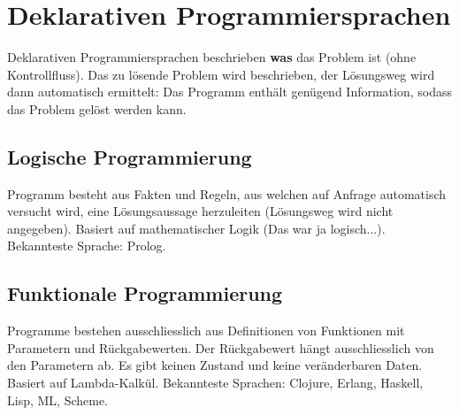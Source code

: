 \section{Deklarativen Programmiersprachen}

Deklarativen Programmiersprachen beschrieben \textbf{was} das Problem ist (ohne Kontrollfluss). Das zu lösende Problem wird beschrieben, der Lösungsweg wird dann automatisch ermittelt: Das Programm enthält genügend Information, sodass das Problem gelöst werden kann.

\subsection{Logische Programmierung}

Programm besteht aus Fakten und Regeln, aus welchen auf Anfrage automatisch versucht wird, eine Lösungsaussage herzuleiten (Lösungsweg wird nicht angegeben). Basiert auf mathematischer Logik (Das war ja logisch...). Bekannteste Sprache: Prolog.

\subsection{Funktionale Programmierung}

Programme bestehen ausschliesslich aus Definitionen von Funktionen mit Parametern und Rückgabewerten. Der Rückgabewert hängt ausschliesslich von den Parametern ab. Es gibt keinen Zustand und keine veränderbaren Daten. Basiert auf Lambda-Kalkül. Bekannteste Sprachen: Clojure, Erlang, Haskell, Lisp, ML, Scheme.